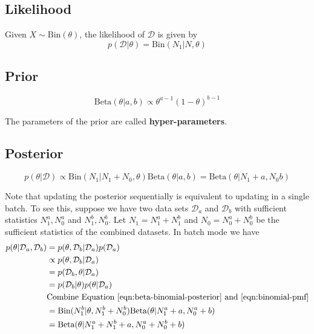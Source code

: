 \subsection{Likelihood}
Given $X \sim \text{Bin}(\theta)$, the likelihood of $\mathcal{D}$ is given by
\begin{equation}
p(\mathcal{D}|\theta)= \text{Bin}(N_1|N,\theta)
\end{equation}


\subsection{Prior}
\begin{equation}
\text{Beta}(\theta|a,b) \propto \theta^{a-1}(1-\theta)^{b-1}
\end{equation}

The parameters of the prior are called \textbf{hyper-parameters}.


\subsection{Posterior}
\begin{equation}\label{eqn:beta-binomial-posterior}
p(\theta|\mathcal{D}) \propto \text{Bin}(N_1|N_1+N_0,\theta)\text{Beta}(\theta|a,b)=\text{Beta}(\theta|N_1+a,N_0b)
\end{equation}

Note that updating the posterior sequentially is equivalent to updating in a single batch. To see this, suppose we have two data sets $\mathcal{D}_a$ and $\mathcal{D}_b$ with sufficient statistics $N_1^a,N_0^a$ and $N_1^b,N_0^b$. Let $N_1=N_1^a+N_1^b$ and $N_0=N_0^a+N_0^b$ be the sufficient statistics of the combined datasets. In batch mode we have
\begin{align*}
p(\theta|\mathcal{D}_a,\mathcal{D}_b)& = p(\theta,\mathcal{D}_b|\mathcal{D}_a)p(\mathcal{D}_a) \\
               &\propto p(\theta,\mathcal{D}_b|\mathcal{D}_a) \\
               & = p(\mathcal{D}_b,\theta|\mathcal{D}_a) \\
			   & = p(\mathcal{D}_b|\theta)p(\theta|\mathcal{D}_a) \\
			   & \text{Combine Equation \ref{eqn:beta-binomial-posterior} and \ref{eqn:binomial-pmf}} \\
			   & =\text{Bin}(N_1^b|\theta, N_1^b+N_0^b)\text{Beta}(\theta|N_1^a+a,N_0^a+b) \\
			   & =\text{Beta}(\theta|N_1^a+N_1^b+a,N_0^a+N_0^b+b)
\end{align*}

